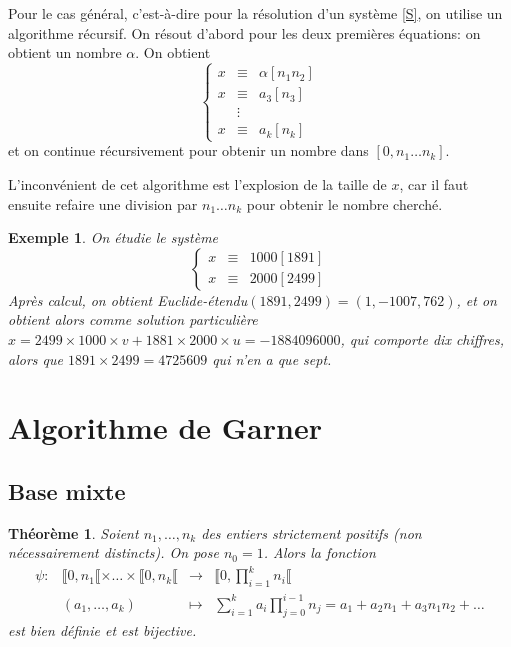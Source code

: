 \documentclass[12pt]{report}
\newtheorem{thm}{Théorème}[chapter]
\newtheorem*{ex}{Exemple}
\begin{document}
Pour le cas général, c'est-à-dire pour la résolution d'un système \eqref{S}, on utilise un algorithme récursif. On résout d'abord pour les deux premières équations: on obtient un nombre $\alpha$. On obtient
\begin{equation*}
\left \{ \begin{array}{ccc}
x & \equiv & \alpha [n_1 n_2] \\
x & \equiv & a_3 [n_3] \\
  &      \vdots    &   \\
x & \equiv & a_k [n_k]   
\end{array}   \right.
\end{equation*}
et on continue récursivement pour obtenir un nombre dans $[0, n_1 \ldots n_k]$.\par 
L'inconvénient de cet algorithme est l'explosion de la taille de $x$, car il faut ensuite refaire une division par $n_1 \ldots n_k$ pour obtenir le nombre cherché.

\begin{ex}
On étudie le système
\begin{equation}\label{Ex}
\left \{ \begin{array}{ccc}
x & \equiv &  1000 [1891] \\
x & \equiv & 2000 [2499]
\end{array}   \right.
\end{equation}
Après calcul, on obtient Euclide-étendu$(1891,2499)=(1,-1007,762)$, et on obtient alors comme solution particulière $x = 2499 \times 1000 \times v + 1881 \times 2000 \times u= -1884096000$, qui comporte dix chiffres, alors que $1891 \times 2499= 4725609 $ qui n'en a que sept.
\end{ex}


\section{Algorithme de Garner}

\subsection{Base mixte}


\begin{thm}
Soient $n_1,\ldots, n_k$ des entiers strictement positifs (non nécessairement distincts). On pose $n_0=1$. Alors la fonction 
\begin{equation*}
\begin{array}{cccl}
  \psi:  &  \llbracket 0,n_1 \llbracket \times \ldots \times \llbracket 0,n_k \llbracket & \longrightarrow  &  \displaystyle  \Big \llbracket 0, \prod_{i=1}^k n_i \Big   \llbracket\\
         & (a_1, \ldots , a_k) & \longmapsto & \displaystyle \sum_{ i =1}^{ k }a_i \prod_{j=0}^{ i-1}n_j =a_1+a_2n_1+a_3 n_1 n_2+\ldots
\end{array}
\end{equation*}
est bien définie  et est bijective.
\end{thm}
\end{document}
